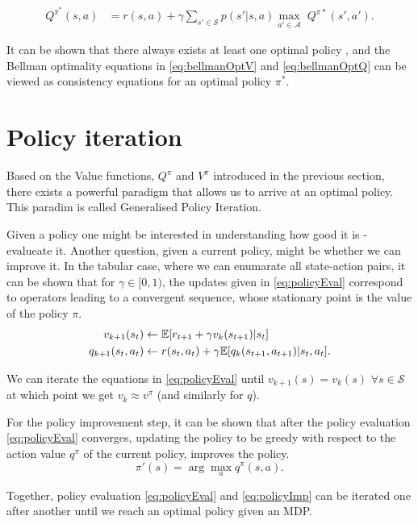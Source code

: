 \documentclass{report}
\numberwithin{equation}{section}
\numberwithin{figure}{section}
\numberwithin{table}{section}
\numberwithin{algorithm}{section}
\begin{document}
\begin{align}\label{eq:bellmanOptQ}
  Q^{\pi^*}(s,a)&=r(s,a) + \gamma \sum_{s'\in \mathcal{S}}p(s'|s, a)\max_{a'\in \mathcal{A}}\;Q^{\pi*}(s', a').
\end{align}

It can be shown that there always exists at least one optimal 
policy \citep{Sutton1998}, and the Bellman optimality equations 
in \ref{eq:bellmanOptV} and \ref{eq:bellmanOptQ} can be viewed 
as consistency equations for an optimal policy $\pi^*$.

\section{Policy iteration}
Based on the Value functions, $Q^{\pi}$ and $V^{\pi}$ introduced in the 
previous section, there exists a powerful paradigm that allows 
us to arrive at an optimal policy. This paradim is called Generalised 
Policy Iteration.

Given a policy one might be interested in understanding how good 
it is - evalueate it. Another question, given a current policy, 
might be whether we can improve it. In the tabular case, where 
we can enumarate all state-action pairs, it can be shown that 
for $\gamma\in[0, 1)$, the updates given in \ref{eq:policyEval} correspond to operators 
leading to a convergent sequence, whose stationary point is the 
value of the policy $\pi$.
\begin{align}\label{eq:policyEval}
  v_{k+1}(s_t) &\gets \mathbb{E}[r_{t+1} + \gamma v_k(s_{t+1})|s_t]\notag\\
  q_{k+1}(s_t, a_t)&\gets r(s_t, a_t) 
  + \gamma\mathbb{E}[q_{k}(s_{t+1}, a_{t+1})|s_t,a_t].
\end{align}

We can iterate the equations in \ref{eq:policyEval} until $v_{k+1}(s)=v_k(s)$ 
$\forall s\in \mathcal{S}$ at which point we get $v_k\approx v^{\pi}$ 
(and similarly for $q$).


For the policy improvement step, it can be shown \citep{Sutton1998} 
that after the 
policy evaluation \ref{eq:policyEval} converges, updating the policy 
to be greedy with respect to the action value $q^{\pi}$ of the 
current policy, improves the policy.
\begin{equation}\label{eq:policyImp}
  \pi'(s)=\arg \max_a q^{\pi}(s, a).
\end{equation}

Together, policy evaluation \ref{eq:policyEval} and \ref{eq:policyImp} 
can be iterated one after another until we reach an optimal policy 
given an MDP.
\end{document}
